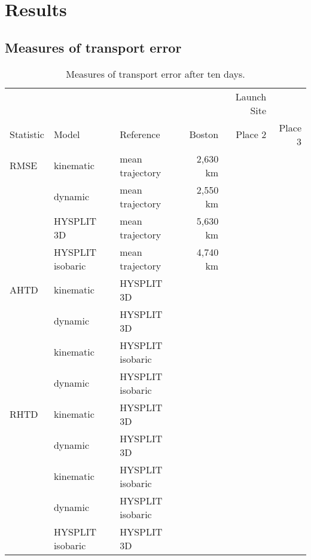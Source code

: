 \chapter{Results}

\section{Measures of transport error}

\begin{table}
    \centering
    \caption{Measures of transport error after ten days.}    
    \begin{tabular}{ l l l r r r }
        \hline
        \hline
        			&				&				& 		& Launch Site\\
	\cline{4-6}
        Statistic 	& Model 			& Reference 		& Boston 		& Place 2	& Place 3 \\
        \hline
        RMSE	& kinematic 		& mean trajectory	& 2,630 km	&		& \\
        		 	& dynamic 		& mean trajectory	& 2,550 km	&		& \\
			& HYSPLIT 3D 		& mean trajectory	& 5,630 km	&		& \\
        		 	& HYSPLIT isobaric 	& mean trajectory	& 4,740 km	&		& \\
        AHTD 	& kinematic		& HYSPLIT 3D		&			&		& \\
        		 	& dynamic			& HYSPLIT 3D 		&			&		& \\
        		 	& kinematic		& HYSPLIT isobaric  &			&		& \\
        		 	& dynamic			& HYSPLIT isobaric  &			&		& \\
        RHTD 	& kinematic		& HYSPLIT 3D		&			&		& \\
        		 	& dynamic			& HYSPLIT 3D 		&			&		& \\
        		 	& kinematic		& HYSPLIT isobaric  &			&		& \\
        		 	& dynamic			& HYSPLIT isobaric  &			&		& \\
			& HYSPLIT isobaric	& HYSPLIT 3D 		&			&		& \\	
        \hline
    \end{tabular}
\end{table}